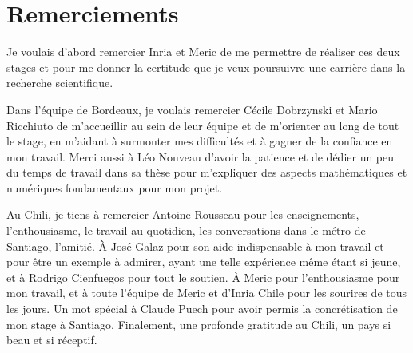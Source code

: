 \section*{Remerciements}

\indent Je voulais d'abord remercier Inria et Meric de me permettre de réaliser ces deux stages et pour me donner la certitude que je veux poursuivre une carrière dans la recherche scientifique.

\indent Dans l'équipe de Bordeaux, je voulais remercier Cécile Dobrzynski et Mario Ricchiuto de m'accueillir au sein de leur équipe et de m'orienter au long de tout le stage, en m'aidant à surmonter mes difficultés et à gagner de la confiance en mon travail.  Merci aussi à Léo Nouveau  d'avoir la patience et de dédier un peu du temps de travail dans sa thèse pour m'expliquer des aspects mathématiques et numériques fondamentaux pour mon projet.

\indent Au Chili, je tiens à remercier Antoine Rousseau pour les enseignements, l’enthousiasme, le travail au quotidien, les conversations dans le métro de Santiago, l'amitié. À José Galaz pour son aide indispensable à mon travail et pour être un exemple à admirer, ayant une telle expérience même étant si jeune, et à Rodrigo Cienfuegos pour tout le soutien. À Meric pour l'enthousiasme pour mon travail, et à toute l'équipe de Meric et d'Inria Chile pour les sourires de tous les jours. Un mot spécial à Claude Puech pour avoir permis la concrétisation de mon stage à Santiago. Finalement, une profonde gratitude au Chili, un pays si beau et si réceptif.
